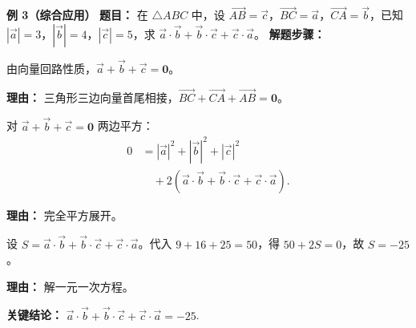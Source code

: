 \begin{examplebox}
	\medskip
	\textbf{\textcolor{CExample}{例 3（综合应用）}}
	\textbf{\textcolor{CExample}{题目：}}
	在 $\triangle ABC$ 中，设 $\overrightarrow{AB} = \vec{c}$，$\overrightarrow{BC} = \vec{a}$，$\overrightarrow{CA} = \vec{b}$，已知 $|\vec{a}|=3$，$|\vec{b}|=4$，$|\vec{c}|=5$，求 $\vec{a}\cdot\vec{b} + \vec{b}\cdot\vec{c} + \vec{c}\cdot\vec{a}$。
	\textbf{\textcolor{CExample}{解题步骤：}}
	\begin{description}[style=nextline, leftmargin=2.8em, labelsep=0.5em, itemsep=0.45em]
		\item[\textbf{第一步（三角形封闭）：}]
		      由向量回路性质，$\vec{a}+\vec{b}+\vec{c} = \mathbf{0}$。
		      \par\textbf{理由：} 三角形三边向量首尾相接，$\overrightarrow{BC}+\overrightarrow{CA}+\overrightarrow{AB}=\mathbf{0}$。
		\item[\textbf{第二步（平方展开）：}]
		      对 $\vec{a}+\vec{b}+\vec{c} = \mathbf{0}$ 两边平方：
		      \[
			      \begin{aligned}
				      0
				       & = |\vec{a}|^2+|\vec{b}|^2+|\vec{c}|^2                                       \\
				       & \quad + 2(\vec{a}\cdot\vec{b} + \vec{b}\cdot\vec{c} + \vec{c}\cdot\vec{a}).
			      \end{aligned}
		      \]
		      \par\textbf{理由：} 完全平方展开。
		\item[\textbf{第三步（计算）：}]
		      设 $S=\vec{a}\cdot\vec{b} + \vec{b}\cdot\vec{c} + \vec{c}\cdot\vec{a}$。代入 $9+16+25 = 50$，得 $50 + 2S = 0$，故 $S = -25$。
		      \par\textbf{理由：} 解一元一次方程。
	\end{description}
	\textbf{\textcolor{CExample}{关键结论：}}
	\textbf{$\vec{a}\cdot\vec{b} + \vec{b}\cdot\vec{c} + \vec{c}\cdot\vec{a} = -25$}.
\end{examplebox}